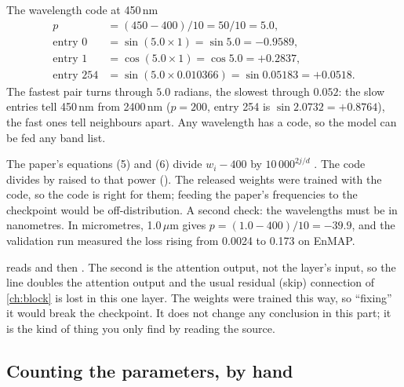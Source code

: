 \begin{worked}[label={we:hslwhat:pe}]{The wavelength code at 450\,nm}
\begin{align*}
p &= (450-400)/10 = 50/10 = 5.0,\\
\text{entry }0 &= \sin(5.0\times1) = \sin 5.0 = -0.9589,\\
\text{entry }1 &= \cos(5.0\times1) = \cos 5.0 = +0.2837,\\
\text{entry }254 &= \sin(5.0\times0.010366) = \sin 0.05183 = +0.0518 .
\end{align*}
The fastest pair turns through $5.0$ radians, the slowest through $0.052$: the slow entries tell 450\,nm from 2400\,nm
($p=200$, entry 254 is $\sin 2.0732=+0.8764$), the fast ones tell neighbours apart\tagC. Any wavelength has a code,
so the model can be fed any band list.
\end{worked}

\begin{sourcenote}
The paper's equations (5) and (6) divide $w_i-400$ by $10\,000^{2j/d}$ \citep{kong2025hypersl}. The code divides by
 raised to that power (). The released weights were trained with the code, so the
code is right for them; feeding the paper's frequencies to the checkpoint would be off-distribution. A second
check: the wavelengths must be in nanometres. In micrometres, 1.0\,$\mu$m gives $p=(1.0-400)/10=-39.9$, and the
validation run measured the loss rising from 0.0024 to 0.173 on EnMAP\tbrk{}.
\end{sourcenote}

\begin{sourcenote}
 reads  and then
. The second  is the attention output, not the layer's input, so the line
doubles the attention output and the usual residual (skip) connection of \cref{ch:block} is lost in this one layer.
The weights were trained this way, so ``fixing'' it would break the checkpoint. It does not change any conclusion in
this part; it is the kind of thing you only find by reading the source.
\end{sourcenote}

\subsection{Counting the parameters, by hand}

